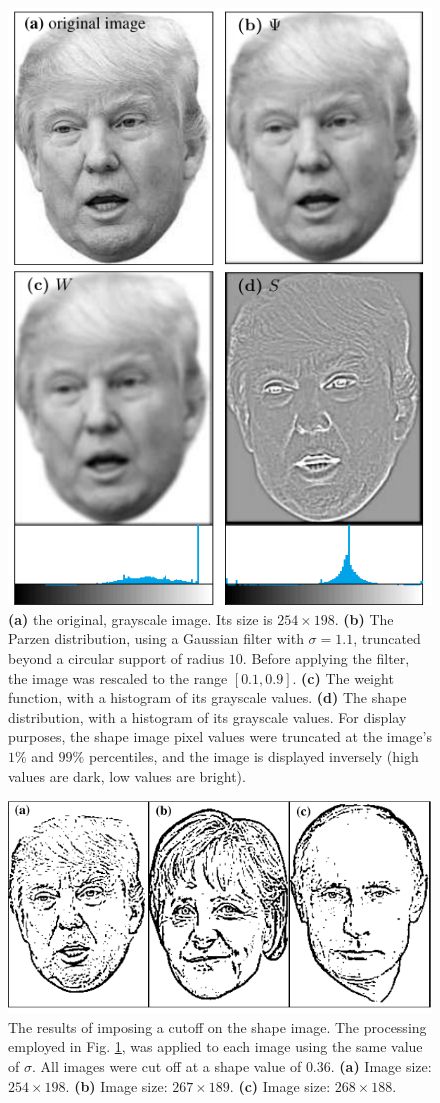 \documentclass[preprint,12pt]{elsarticle}
\begin{document}
\begin{figure}[tbh]
\centering
\includegraphics[width=.6\linewidth]{fig6.pdf}
\caption{\textbf{(a)} the original, grayscale image. Its size is $254\times198$. \textbf{(b)} The Parzen distribution, using a Gaussian filter with $\sigma=1.1$, truncated beyond a circular support of radius $10$. Before applying the filter, the image was rescaled to the range $[0.1,0.9]$. \textbf{(c)} The weight function, with a histogram of its grayscale values. \textbf{(d)} The shape distribution, with a histogram of its grayscale values. For display purposes, the shape image pixel values were truncated at the image's $1\%$ and $99\%$ percentiles, and the image is displayed inversely (high values are dark, low values are bright).}
\label{Trump}
\end{figure}

\begin{figure}[tbh]
\centering
\includegraphics[width=0.6\linewidth]{fig7.pdf}
\caption{The results of imposing a cutoff on the shape image. The  processing employed in Fig. \ref{Trump}, was applied to each image using the same value of $\sigma$. All images were cut off at a shape value of $0.36$. \textbf{(a)} Image size: $254\times198$. \textbf{(b)} Image size: $267\times189$. \textbf{(c)} Image size: $268\times188$.}
\label{leaders}
\end{figure}
\end{document}
